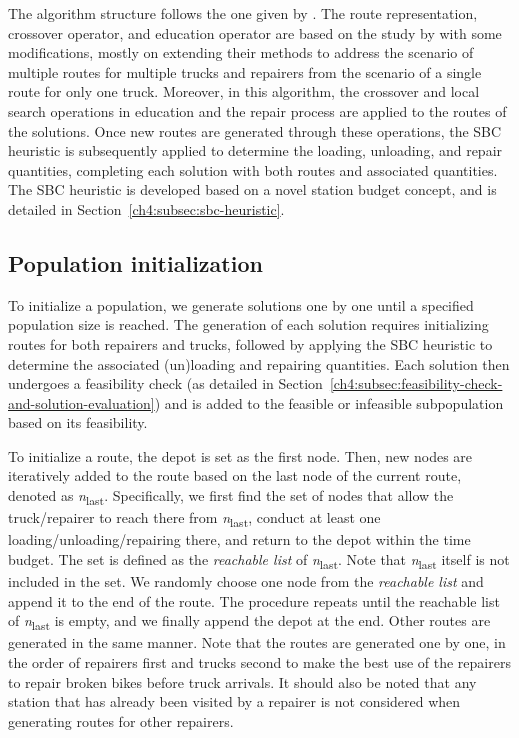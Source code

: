 The algorithm structure follows the one given by
\citet{vidalHybridGeneticAlgorithm2012,vidalHybridGeneticAlgorithm2013,vidalUnifiedSolutionFramework2014}. The route representation, crossover operator, and education operator are based on the
study by \citet{liMultipleTypeBike2016} with some modifications, mostly on extending their methods to address the
scenario of multiple routes for multiple trucks and repairers from the scenario of a single route
for only one truck. Moreover, in this algorithm, the crossover and local search operations in
education and the repair process are applied to the routes of the solutions. Once new routes are
generated through these operations, the SBC heuristic is subsequently applied to determine the
loading, unloading, and repair quantities, completing each solution with both routes and associated
quantities. The SBC heuristic is developed based on a novel station budget concept, and is detailed
in Section~\ref{ch4:subsec:sbc-heuristic}.

\subsection{Population initialization}\label{ch4:subsec:population-initialization}

To initialize a population, we generate solutions one by one until a specified population size is
reached. The generation of each solution requires initializing routes for both repairers and trucks,
followed by applying the SBC heuristic to determine the associated (un)loading and repairing
quantities. Each solution then undergoes a feasibility check (as detailed in Section~\ref{ch4:subsec:feasibility-check-and-solution-evaluation}) and is
added to the feasible or infeasible subpopulation based on its feasibility.

To initialize a route, the depot is set as the first node. Then, new nodes are iteratively added to
the route based on the last node of the current route, denoted as \emph{n}\textsubscript{last}.
Specifically, we first find the set of nodes that allow the truck/repairer to reach there from
\emph{n}\textsubscript{last}, conduct at least one loading/unloading/repairing there, and return to
the depot within the time budget. The set is defined as the \emph{reachable list} of
\emph{n}\textsubscript{last}. Note that \emph{n}\textsubscript{last} itself is not included in the
set. We randomly choose one node from the \emph{reachable list} and append it to the end of the
route. The procedure repeats until the reachable list of \emph{n}\textsubscript{last} is empty, and
we finally append the depot at the end. Other routes are generated in the same manner. Note that the
routes are generated one by one, in the order of repairers first and trucks second to make the best
use of the repairers to repair broken bikes before truck arrivals. It should also be noted that any
station that has already been visited by a repairer is not considered when generating routes for
other repairers.


